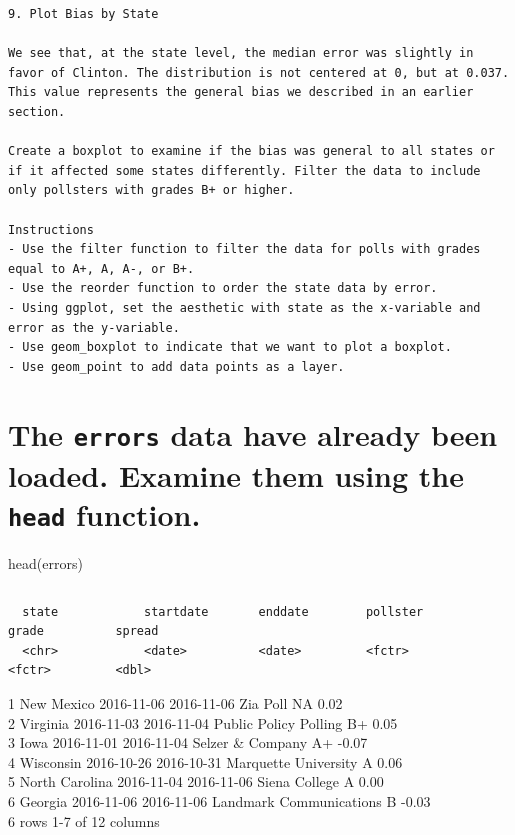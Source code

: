 \documentclass[
]{article}
\begin{document}
\begin{verbatim}
9. Plot Bias by State

We see that, at the state level, the median error was slightly in favor of Clinton. The distribution is not centered at 0, but at 0.037. This value represents the general bias we described in an earlier section.

Create a boxplot to examine if the bias was general to all states or if it affected some states differently. Filter the data to include only pollsters with grades B+ or higher.

Instructions
- Use the filter function to filter the data for polls with grades equal to A+, A, A-, or B+.
- Use the reorder function to order the state data by error.
- Using ggplot, set the aesthetic with state as the x-variable and error as the y-variable.
- Use geom_boxplot to indicate that we want to plot a boxplot.
- Use geom_point to add data points as a layer.
\end{verbatim}

\hypertarget{the-errors-data-have-already-been-loaded.-examine-them-using-the-head-function.-1}{%
\section{\texorpdfstring{The \texttt{errors} data have already been
loaded. Examine them using the \texttt{head}
function.}{The errors data have already been loaded. Examine them using the head function.}}\label{the-errors-data-have-already-been-loaded.-examine-them-using-the-head-function.-1}}

head(errors)

\begin{verbatim}
\end{verbatim}

\begin{verbatim}
  state            startdate       enddate        pollster                 grade          spread
  <chr>            <date>          <date>         <fctr>                   <fctr>         <dbl>
\end{verbatim}

1 New Mexico 2016-11-06 2016-11-06 Zia Poll NA 0.02\\
2 Virginia 2016-11-03 2016-11-04 Public Policy Polling B+ 0.05\\
3 Iowa 2016-11-01 2016-11-04 Selzer \& Company A+ -0.07\\
4 Wisconsin 2016-10-26 2016-10-31 Marquette University A 0.06\\
5 North Carolina 2016-11-04 2016-11-06 Siena College A 0.00\\
6 Georgia 2016-11-06 2016-11-06 Landmark Communications B -0.03\\
6 rows \textbar{} 1-7 of 12 columns
\end{document}
